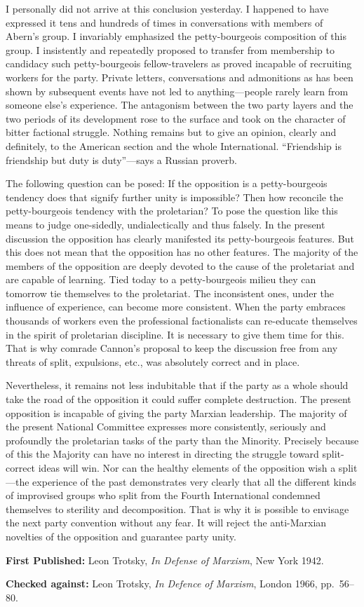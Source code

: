 I personally did not arrive at this conclusion yesterday. I happened to have expressed it tens and hundreds of times in conversations with members of Abern’s group. I invariably emphasized the petty-bourgeois composition of this group. I insistently and repeatedly proposed to transfer from membership to candidacy such petty-bourgeois fellow-travelers as proved incapable of recruiting workers for the party. Private letters, conversations and admonitions as has been shown by subsequent events have not led to anything---people rarely learn from someone else’s experience. The antagonism between the two party layers and the two periods of its development rose to the surface and took on the character of bitter factional struggle. Nothing remains but to give an opinion, clearly and definitely, to the American section and the whole International. “Friendship is friendship but duty is duty”---says a Russian proverb.

The following question can be posed: If the opposition is a petty-bourgeois tendency does that signify further unity is impossible? Then how reconcile the petty-bourgeois tendency with the proletarian? To pose the question like this means to judge one-sidedly, undialectically and thus falsely. In the present discussion the opposition has clearly manifested its petty-bourgeois features. But this does not mean that the opposition has no other features. The majority of the members of the opposition are deeply devoted to the cause of the proletariat and are capable of learning. Tied today to a petty-bourgeois milieu they can tomorrow tie themselves to the proletariat. The inconsistent ones, under the influence of experience, can become more consistent. When the party embraces thousands of workers even the professional factionalists can re-educate themselves in the spirit of proletarian discipline. It is necessary to give them time for this. That is why comrade Cannon’s proposal to keep the discussion free from any threats of split, expulsions, etc., was absolutely correct and in place.

Nevertheless, it remains not less indubitable that if the party as a whole should take the road of the opposition it could suffer complete destruction. The present opposition is incapable of giving the party Marxian leadership. The majority of the present National Committee expresses more consistently, seriously and profoundly the proletarian tasks of the party than the Minority. Precisely because of this the Majority can have no interest in directing the struggle toward split-correct ideas will win. Nor can the healthy elements of the opposition wish a split---the experience of the past demonstrates very clearly that all the different kinds of improvised groups who split from the Fourth International condemned themselves to sterility and decomposition. That is why it is possible to envisage the next party convention without any fear. It will reject the anti-Marxian novelties of the opposition and guarantee party unity.


\begin{letterinfo}
  \textbf{First Published:} Leon Trotsky, \emph{In Defense of Marxism}, New York 1942.
  
  \textbf{Checked against:} Leon Trotsky, \emph{In Defence of Marxism}, London 1966, pp.~56--80.
\end{letterinfo}